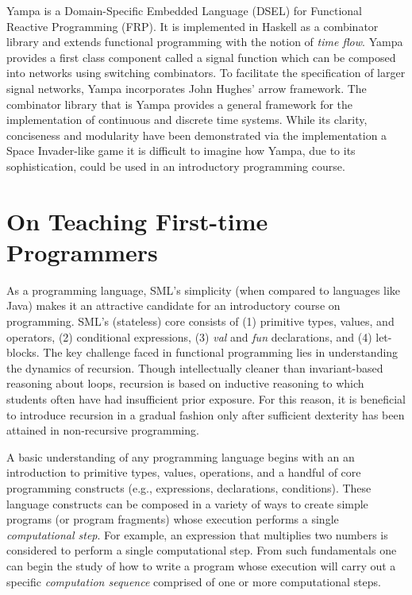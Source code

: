 \documentclass[submission,copyright,creativecommons]{eptcs}
\begin{document}
Yampa \cite{Courtney:Yampa} is a Domain-Specific Embedded Language (DSEL) for Functional Reactive Programming (FRP). It is implemented in Haskell as a combinator library and extends functional programming with the notion of \emph{time flow}. Yampa provides a first class component called a signal function which can be composed into networks using switching combinators. To facilitate the specification of larger signal networks, Yampa incorporates John Hughes' arrow framework. The combinator library that is Yampa provides a general framework for the implementation of continuous and discrete time systems. While its clarity, conciseness and modularity have been demonstrated via the implementation a Space Invader-like game it is difficult to imagine how Yampa, due to its sophistication, could be used in an introductory programming course.

\section{On Teaching First-time Programmers}\label{section-teaching}


As a programming language, SML's simplicity (when compared to languages like Java) makes it an attractive candidate for an introductory course on programming. SML's (stateless) core consists of (1) primitive types, values, and operators, (2) conditional expressions, (3) \emph{val} and \emph{fun} declarations, and (4) let-blocks. The key challenge faced in functional programming lies in understanding the dynamics of recursion. Though intellectually cleaner than invariant-based reasoning about loops, recursion is based on inductive reasoning to which students often have had insufficient prior exposure. For this reason, it is beneficial to introduce recursion in a gradual fashion only after sufficient dexterity has been attained in non-recursive programming.



A basic understanding of any programming language begins with an an introduction to primitive types, values, operations, and a handful of core programming constructs (e.g., expressions, declarations, conditions). These language constructs can be composed in a variety of ways to create simple programs (or program fragments) whose execution performs a single \emph{computational step}. For example, an expression that multiplies two numbers is considered to perform a single computational step. From such fundamentals one can begin the study of how to write a program whose execution will carry out a specific \emph{computation sequence} comprised of one or more computational steps.
\end{document}
